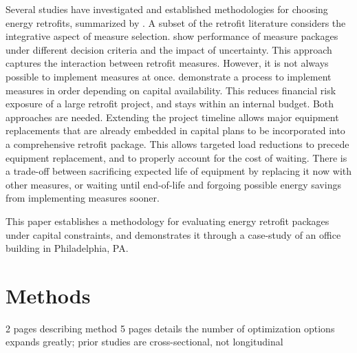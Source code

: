 \documentclass[review]{elsarticle}
\begin{document}
Several studies have investigated and established methodologies for choosing energy retrofits, summarized by \cite{Ma2012889}.  A subset of the retrofit literature considers the integrative aspect of measure selection. \cite{Rysanek2013324} show performance of measure packages under different decision criteria and the impact of uncertainty.  This approach captures the interaction between retrofit measures.  However, it is not always possible to implement measures at once.  \cite{Kumbaroglu2012327} demonstrate a process to implement measures in order depending on capital availability.  This reduces financial risk exposure of a large retrofit project, and stays within an internal budget.  Both approaches are needed.  Extending the project timeline allows major equipment replacements that are already embedded in capital plans to be incorporated into a comprehensive retrofit package.  This allows targeted load reductions to precede equipment replacement, and to properly account for the cost of waiting.  There is a trade-off between sacrificing expected life of equipment by replacing it now with other measures, or waiting until end-of-life and forgoing possible energy savings from implementing measures sooner.\par 
This paper establishes a methodology for evaluating energy retrofit packages under capital constraints, and demonstrates it through a case-study of an office building in Philadelphia, PA. 

\section{Methods}
2 pages describing method
5 pages details
the number of optimization options expands greatly; prior studies are cross-sectional, not longitudinal
\end{document}

